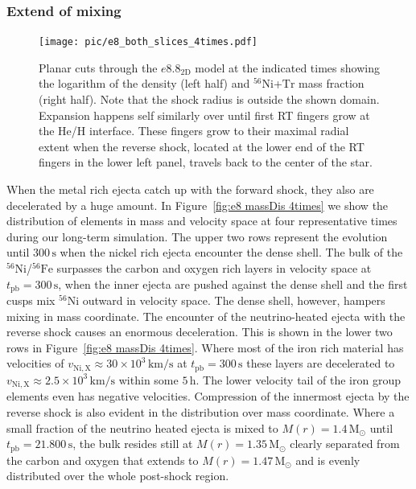 \documentclass[fleqn,usenatbib]{mnras}
\newcommand{\nickel}{\ensuremath{\mathrm{^{56}Ni}}\xspace}
\newcommand{\tracer}{\ensuremath{\mathrm{Tr}}\xspace}
\newcommand{\iron}{\ensuremath{\mathrm{^{56}Fe}}\xspace}
\newcommand{\s}{\ensuremath{\text{s}}}
\begin{document}
\subsubsection{Extend of mixing}
\begin{figure}%
 \centering
 \texttt{[image: pic/e8\_both\_slices\_4times.pdf]} 
 \caption{Planar cuts through the $e8.8_{\mathrm{2D}}$ model at the indicated times showing the logarithm of the density (left half) and \nickel+\tracer mass fraction (right half). Note that the shock radius is outside the shown domain. Expansion happens self similarly over until first RT fingers grow at the He/H interface. These fingers grow to their maximal radial extent when the reverse shock, located at the lower end of the RT fingers in the lower left panel, travels back to the center of the star.}
 \label{fig:e8 3d 4times}
\end{figure}
When the metal rich ejecta catch up with the forward shock, they also are decelerated by a huge amount.
In Figure~\ref{fig:e8 massDis 4times} we show the distribution of elements in mass and velocity space at four representative times during our long-term simulation. The upper two rows represent the evolution until $300\,\text{s}$ when the nickel rich ejecta encounter the dense shell.
The bulk of the \nickel/\iron surpasses the carbon and oxygen rich layers in velocity space at $t_{\mathrm{pb}}=300\,\text{s}$, when the inner ejecta are pushed against the dense shell and the first cusps mix \nickel outward in velocity space. The dense shell, however, hampers mixing in mass coordinate.
The encounter of the neutrino-heated ejecta with the reverse shock causes an enormous deceleration. This is shown in the lower two rows in Figure~\ref{fig:e8 massDis 4times}. Where most of the iron rich material has velocities of $v_{\mathrm{Ni,X}}\approx 30\times10^3 \,\mathrm{km/s}$ at $t_{\mathrm{pb}}=300\,\text{s}$ these layers are decelerated to $v_{\mathrm{Ni,X}}\approx 2.5\times 10^3\,\mathrm{km/s}$ within some $5 \,\mathrm{h}$. The lower velocity tail of the iron group elements even has negative velocities. 
Compression of the innermost ejecta by the reverse shock is also evident in the distribution over mass coordinate. Where a small fraction of the neutrino heated ejecta is mixed to $M(r)=1.4\,\mathrm{M_{\odot}}$ until $t_{\mathrm{pb}}=21.800\,\s$, the bulk resides still at  $M(r)=1.35\,\mathrm{M_{\odot}}$ clearly separated from the carbon and oxygen that extends to $M(r)=1.47\,\mathrm{M_{\odot}}$ and is evenly distributed over the whole post-shock region.
\end{document}
